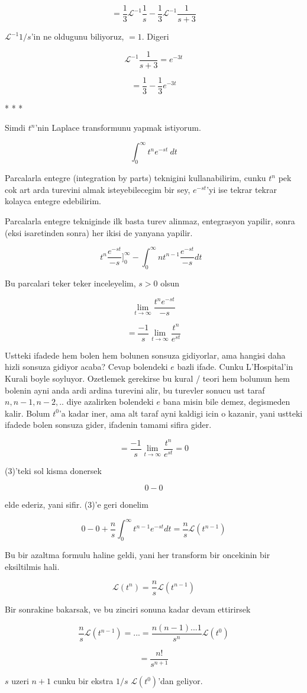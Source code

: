 \documentclass[12pt,fleqn]{article}
\begin{document}
\[ = \frac{1}{3} \mathcal{L}^{-1}\frac{1}{s}  - 
\frac{1}{3} \mathcal{L}^{-1}\frac{1}{s+3}  
\]

$\mathcal{L}^{-1}1/s$'in ne oldugunu biliyoruz, $=1$. Digeri

\[ \mathcal{L}^{-1}\frac{1}{s+3}  = e^{-3t} \]

\[ =  
\frac{1}{3} - \frac{1}{3} e^{-3t}
\]

* * * 

Simdi $t^n$'nin Laplace transformunu yapmak istiyorum. 

\[ \int_0^{\infty} t^ne^{-st} \ dt \]

Parcalarla entegre (integration by parts) teknigini kullanabilirim, cunku
$t^n$ pek cok art arda turevini almak isteyebilecegim bir sey, $e^{-st}$'yi
ise tekrar tekrar kolayca entegre edebilirim. 

Parcalarla entegre tekniginde ilk basta turev alinmaz, entegrasyon yapilir,
sonra (eksi isaretinden sonra) her ikisi de yanyana yapilir. 

\[ t^n \frac{e^{-st}}{-s} \bigg]_{0}^{\infty}  - 
\int_{0}^{\infty} nt^{n-1} \frac{e^{-st}}{-s} dt
\ \ \ \label{3}
\] 

Bu parcalari teker teker inceleyelim, $s>0$ olsun

\[ \lim_{t \to \infty} \frac{t^n  e^{-st}}{-s}\] 

\[ = \frac{-1}{s}\lim_{t \to \infty} \frac{t^n}{ e^{st}}\] 

Ustteki ifadede hem bolen hem bolunen sonsuza gidiyorlar, ama hangisi daha
hizli sonsuza gidiyor acaba? Cevap bolendeki $e$ bazli ifade. Cunku
L'Hospital'in Kurali boyle soyluyor. Ozetlemek gerekirse bu kural / teori
hem bolumun hem bolenin ayni anda ardi ardina turevini alir, bu turevler
sonucu ust taraf $n,n-1,n-2,..$ diye azalirken bolendeki $e$ bana misin
bile demez, degismeden kalir. Bolum $t^0$'a kadar iner, ama alt taraf ayni
kaldigi icin o kazanir, yani ustteki ifadede bolen sonsuza gider, ifadenin
tamami sifira gider. 

\[ = \frac{-1}{s}\lim_{t \to \infty} \frac{t^n}{ e^{st}} = 0\] 

(3)'teki sol kisma donersek 

\[ 0 - 0  \]

elde ederiz, yani sifir. (3)'e geri donelim

\[ 0 - 0   +
\frac{n}{s} \int_{0}^{\infty} t^{n-1} e^{-st} dt = 
\frac{n}{s} \mathcal{L} (t^{n-1})
\]

Bu bir azaltma formulu haline geldi, yani her transform bir oncekinin bir
eksiltilmis hali. 

\[ \mathcal{L} (t^n) = \frac{n}{s} \mathcal{L} (t^{n-1}) 
 \]

Bir sonrakine bakarsak, ve bu zinciri sonuna kadar devam ettirirsek

\[ \frac{n}{s} \mathcal{L} (t^{n-1}) = ... = 
\frac{n(n-1)...1 }{s^n}\mathcal{L}(t^0)
 \]

\[ = \frac{n!}{s^{n+1}} \]

$s$ uzeri $n+1$ cunku bir ekstra $1/s$ $\mathcal{L} (t^0)$'dan geliyor. 
\end{document}
